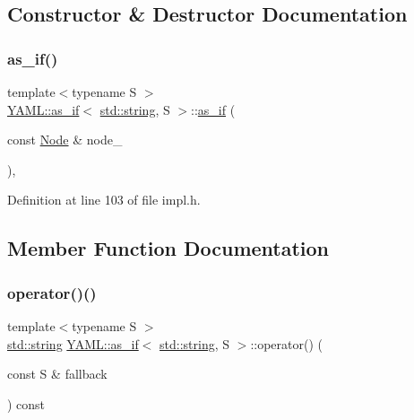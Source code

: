 \subsection{Constructor \& Destructor Documentation}
\mbox{\label{struct_y_a_m_l_1_1as__if_3_01std_1_1string_00_01_s_01_4_adb716ee9514394699a2fccac9723c390}} 
\subsubsection{\texorpdfstring{as\_if()}{as\_if()}}
{\footnotesize\ttfamily template$<$typename S $>$ \\
\mbox{\hyperlink{struct_y_a_m_l_1_1as__if}{Y\+A\+M\+L\+::as\+\_\+if}}$<$ \mbox{\hyperlink{glad_8h_ac83513893df92266f79a515488701770}{std\+::string}}, S $>$\+::\mbox{\hyperlink{struct_y_a_m_l_1_1as__if}{as\+\_\+if}} (\begin{DoxyParamCaption}\item[{const \mbox{\hyperlink{class_y_a_m_l_1_1_node}{Node}} \&}]{node\+\_\+ }\end{DoxyParamCaption})\hspace{0.3cm}{\ttfamily [inline]}, {\ttfamily [explicit]}}



Definition at line 103 of file impl.\+h.



\subsection{Member Function Documentation}
\mbox{\label{struct_y_a_m_l_1_1as__if_3_01std_1_1string_00_01_s_01_4_a19fdfc39f80777cf214c2530b3e5d260}} 
\subsubsection{\texorpdfstring{operator()()}{operator()()}}
{\footnotesize\ttfamily template$<$typename S $>$ \\
\mbox{\hyperlink{glad_8h_ac83513893df92266f79a515488701770}{std\+::string}} \mbox{\hyperlink{struct_y_a_m_l_1_1as__if}{Y\+A\+M\+L\+::as\+\_\+if}}$<$ \mbox{\hyperlink{glad_8h_ac83513893df92266f79a515488701770}{std\+::string}}, S $>$\+::operator() (\begin{DoxyParamCaption}\item[{const S \&}]{fallback }\end{DoxyParamCaption}) const\hspace{0.3cm}{\ttfamily [inline]}}



